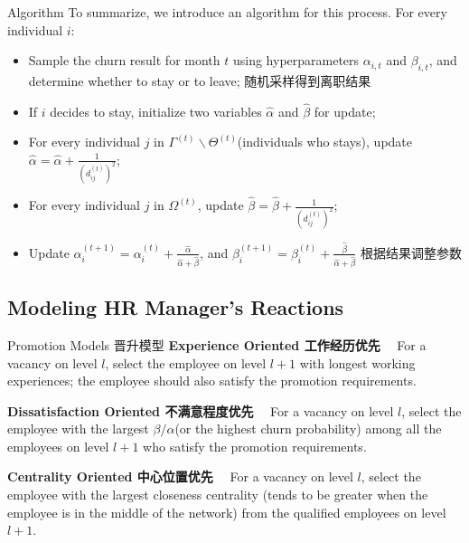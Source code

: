 \documentclass{beamer}
\begin{document}
\begin{CJK*}{UTF8}{gbsn}

\begin{frame}{Algorithm}
To summarize, we introduce an algorithm for this process. For every individual $i$:
\begin{itemize}
\item Sample the churn result for month $t$ using hyperparameters $\alpha_{i,t}$ and $\beta_{i,t}$, and determine whether to stay or to leave; 随机采样得到离职结果
\item If $i$ decides to stay, initialize two variables $\hat{\alpha}$ and $\hat{\beta}$ for update; 
\item For every individual $j$ in $\Gamma^{(t)} \backslash \Theta^{(t)}$(individuals who stays), update $\hat{\alpha} = \hat{\alpha} + \frac{1}{(d_{ij}^{(t)})^2}$;
\item For every individual $j$ in $\Omega^{(t)}$, update $ \hat{\beta} = \hat{\beta} + \frac{1}{(d_{ij}^{(t)})^2}$;
\item Update $ \alpha_{i}^{(t+1)}=\alpha_{i}^{(t)}+\frac{\hat{\alpha}}{\hat{\alpha}+\hat{\beta}}$, and $ \beta_{i}^{(t+1)}=\beta_{i}^{(t)}+\frac{\hat{\beta}}{\hat{\alpha}+\hat{\beta}}$ 根据结果调整参数
\end{itemize}
\end{frame}

\subsection{Modeling HR Manager's Reactions}
\begin{frame}{Promotion Models 晋升模型}
\textbf{Experience Oriented 工作经历优先} \ \ For a vacancy on level $l$, select the employee on level $l+1$ with longest working experiences; the employee should also satisfy the promotion requirements. \vspace{0.5em}

\textbf{Dissatisfaction Oriented 不满意程度优先} \ \  For a vacancy on level $l$, select the employee with the largest $\beta / \alpha$(or the highest churn probability) among all the employees on level $l+1$ who satisfy the promotion requirements. \vspace{0.5em}

\textbf{Centrality Oriented 中心位置优先} \ \ For a vacancy on level $l$, select the employee with the largest closeness centrality (tends to be greater when the employee is in the middle of the network) from the qualified employees on level $l+1$. \vspace{0.5em}


\end{frame}
\end{CJK*}
\end{document}
